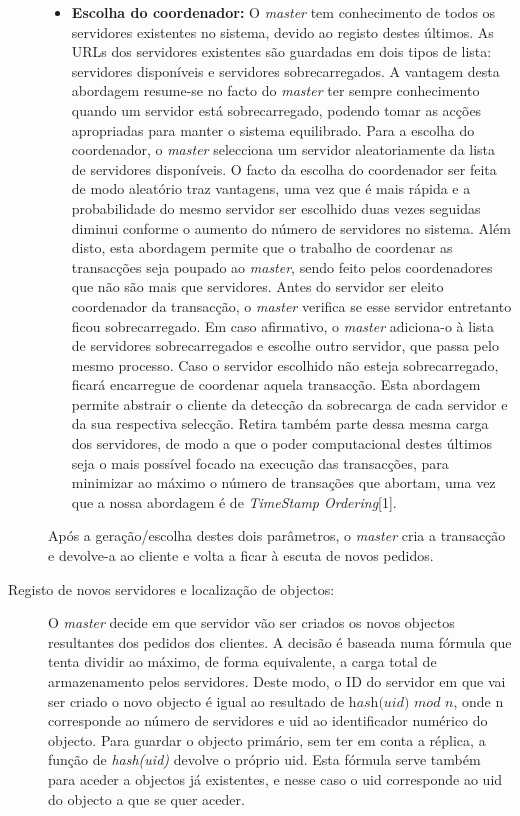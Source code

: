 \begin{description}
\begin{itemize}
\item \textbf{Escolha do coordenador:} O \textit{master} tem conhecimento de todos os servidores existentes no sistema, devido ao registo destes últimos. As URLs dos servidores existentes são guardadas em dois tipos de lista: servidores disponíveis e servidores sobrecarregados. A vantagem desta abordagem resume-se no facto do \textit{master} ter  sempre conhecimento quando um servidor está sobrecarregado, podendo tomar as acções apropriadas para manter o sistema equilibrado.
Para a escolha do coordenador, o \textit{master} selecciona um servidor aleatoriamente da lista de servidores disponíveis. O facto da escolha do coordenador ser feita de modo aleatório traz vantagens, uma vez que é mais rápida e a probabilidade do mesmo servidor ser escolhido duas vezes seguidas diminui conforme o aumento do número de servidores no sistema. Além disto, esta abordagem permite que o trabalho de coordenar as transacções seja poupado ao \textit{master}, sendo feito pelos coordenadores que não são mais que servidores.
Antes do servidor ser eleito coordenador da transacção, o \textit{master} verifica se esse servidor entretanto ficou sobrecarregado. Em caso afirmativo, o \textit{master} adiciona-o à lista de servidores sobrecarregados e escolhe outro servidor, que passa pelo mesmo processo. Caso o servidor escolhido não esteja sobrecarregado, ficará encarregue de coordenar aquela transacção.  Esta abordagem permite abstrair o cliente da detecção da sobrecarga de cada servidor e da sua respectiva selecção. Retira também parte dessa mesma carga dos servidores, de modo a que o poder computacional destes últimos seja o mais possível focado na execução das transacções, para minimizar ao máximo o número de transações que abortam, uma vez que a nossa abordagem é de \textit{TimeStamp Ordering}[1].
\end{itemize}
Após a geração/escolha destes dois parâmetros, o \textit{master} cria a transacção e devolve-a ao cliente e volta a ficar à escuta de novos pedidos.

\item[Registo de novos servidores e localização de objectos:]
O \textit{master} decide em que servidor vão ser criados os novos objectos resultantes dos pedidos dos clientes. A decisão é baseada numa fórmula que tenta dividir ao máximo, de forma equivalente, a carga total de armazenamento pelos servidores. Deste modo, o ID do servidor em que vai ser criado o novo objecto é igual ao resultado de $ \textit{hash(uid) mod n} $, onde n corresponde ao número de servidores e uid ao identificador numérico do objecto. Para guardar o objecto primário, sem ter em conta a réplica, a função de \textit{hash(uid)} devolve o próprio uid. Esta fórmula serve também para aceder a objectos já existentes, e nesse caso o uid corresponde ao uid do objecto a que se quer aceder.


\end{description}
